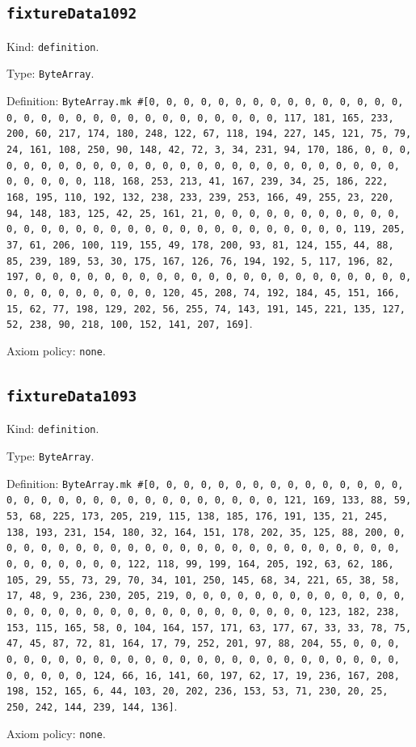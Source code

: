 \documentclass[11pt]{article}
\begin{document}
\subsection*{\texttt{fixtureData1092}}
\noindent Kind: \texttt{definition}.\par
\noindent Type: \texttt{ByteArray}.\par
\noindent Definition: \texttt{ByteArray.mk \#[0, 0, 0, 0, 0, 0, 0, 0, 0, 0, 0, 0, 0, 0, 0, 0, 0, 0, 0, 0, 0, 0, 0, 0, 0, 0, 0, 0, 0, 0, 0, 117, 181, 165, 233, 200, 60, 217, 174, 180, 248, 122, 67, 118, 194, 227, 145, 121, 75, 79, 24, 161, 108, 250, 90, 148, 42, 72, 3, 34, 231, 94, 170, 186, 0, 0, 0, 0, 0, 0, 0, 0, 0, 0, 0, 0, 0, 0, 0, 0, 0, 0, 0, 0, 0, 0, 0, 0, 0, 0, 0, 0, 0, 0, 0, 118, 168, 253, 213, 41, 167, 239, 34, 25, 186, 222, 168, 195, 110, 192, 132, 238, 233, 239, 253, 166, 49, 255, 23, 220, 94, 148, 183, 125, 42, 25, 161, 21, 0, 0, 0, 0, 0, 0, 0, 0, 0, 0, 0, 0, 0, 0, 0, 0, 0, 0, 0, 0, 0, 0, 0, 0, 0, 0, 0, 0, 0, 0, 0, 119, 205, 37, 61, 206, 100, 119, 155, 49, 178, 200, 93, 81, 124, 155, 44, 88, 85, 239, 189, 53, 30, 175, 167, 126, 76, 194, 192, 5, 117, 196, 82, 197, 0, 0, 0, 0, 0, 0, 0, 0, 0, 0, 0, 0, 0, 0, 0, 0, 0, 0, 0, 0, 0, 0, 0, 0, 0, 0, 0, 0, 0, 0, 0, 120, 45, 208, 74, 192, 184, 45, 151, 166, 15, 62, 77, 198, 129, 202, 56, 255, 74, 143, 191, 145, 221, 135, 127, 52, 238, 90, 218, 100, 152, 141, 207, 169]}.\par
\noindent Axiom policy: \texttt{none}.\par
\subsection*{\texttt{fixtureData1093}}
\noindent Kind: \texttt{definition}.\par
\noindent Type: \texttt{ByteArray}.\par
\noindent Definition: \texttt{ByteArray.mk \#[0, 0, 0, 0, 0, 0, 0, 0, 0, 0, 0, 0, 0, 0, 0, 0, 0, 0, 0, 0, 0, 0, 0, 0, 0, 0, 0, 0, 0, 0, 0, 121, 169, 133, 88, 59, 53, 68, 225, 173, 205, 219, 115, 138, 185, 176, 191, 135, 21, 245, 138, 193, 231, 154, 180, 32, 164, 151, 178, 202, 35, 125, 88, 200, 0, 0, 0, 0, 0, 0, 0, 0, 0, 0, 0, 0, 0, 0, 0, 0, 0, 0, 0, 0, 0, 0, 0, 0, 0, 0, 0, 0, 0, 0, 0, 122, 118, 99, 199, 164, 205, 192, 63, 62, 186, 105, 29, 55, 73, 29, 70, 34, 101, 250, 145, 68, 34, 221, 65, 38, 58, 17, 48, 9, 236, 230, 205, 219, 0, 0, 0, 0, 0, 0, 0, 0, 0, 0, 0, 0, 0, 0, 0, 0, 0, 0, 0, 0, 0, 0, 0, 0, 0, 0, 0, 0, 0, 0, 0, 123, 182, 238, 153, 115, 165, 58, 0, 104, 164, 157, 171, 63, 177, 67, 33, 33, 78, 75, 47, 45, 87, 72, 81, 164, 17, 79, 252, 201, 97, 88, 204, 55, 0, 0, 0, 0, 0, 0, 0, 0, 0, 0, 0, 0, 0, 0, 0, 0, 0, 0, 0, 0, 0, 0, 0, 0, 0, 0, 0, 0, 0, 0, 0, 124, 66, 16, 141, 60, 197, 62, 17, 19, 236, 167, 208, 198, 152, 165, 6, 44, 103, 20, 202, 236, 153, 53, 71, 230, 20, 25, 250, 242, 144, 239, 144, 136]}.\par
\noindent Axiom policy: \texttt{none}.\par
\end{document}
